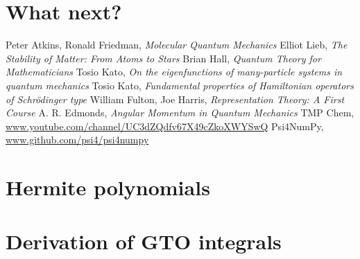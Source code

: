 \documentclass{book}
\begin{document}
\chapter{What next?} \label{chap:next}

\begin{thebibliography}{9}
	Peter Atkins, Ronald Friedman,
	\textit{Molecular Quantum Mechanics}
	Elliot Lieb,
	\textit{The Stability of Matter: From Atoms to Stars}
	Brian Hall,
	\textit{Quantum Theory for Mathematicians}
	Tosio Kato,
	\textit{On the eigenfunctions of many-particle systems in quantum mechanics}
	Tosio Kato,
	\textit{Fundamental properties of Hamiltonian operators of Schrödinger type}
	William Fulton, Joe Harris,
	\textit{Representation Theory: A First Course}
	A. R. Edmonds,
	\textit{Angular Momentum in Quantum Mechanics}
	TMP Chem,
	\url{www.youtube.com/channel/UC3dZQdfv67X49cZkoXWYSwQ}
	Psi4NumPy,
	\url{www.github.com/psi4/psi4numpy}
\end{thebibliography}

\begin{appendices}
\chapter{Hermite polynomials} \label{apx:hermite}
\chapter{Derivation of GTO integrals} \label{apx:integrals}
\end{appendices}
\end{document}
